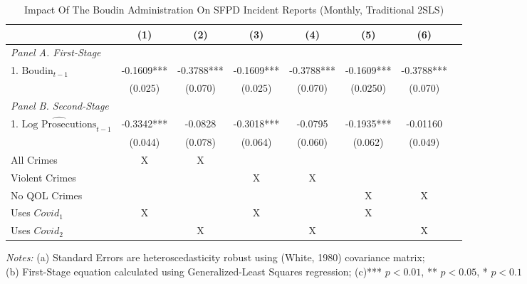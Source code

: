\begin{table}[htbp]
  \centering
  \caption{Impact Of The Boudin Administration On SFPD Incident Reports (Monthly, Traditional 2SLS)}
  \label{tab:regression_incidents_std}
  \begin{tabular}{lccccccc}
    \toprule
    & \multirow{1}{*}{(1)} & \multirow{1}{*}{(2)} & \multirow{1}{*}{(3)} & \multirow{1}{*}{(4)} & \multirow{1}{*}{(5)} & \multirow{1}{*}{(6)} \\
    \midrule
    \textit{Panel A. First-Stage}  &   &   &  &  \\
    1. $\text{Boudin}_{t-1}$  & -0.1609*** & -0.3788*** & -0.1609*** & -0.3788*** & -0.1609*** & -0.3788*** \\
     & (0.025) & (0.070) & (0.025) & (0.070) & (0.0250) & (0.070)
 \\ \addlinespace

    \textit{Panel B. Second-Stage}  &   &   &  &  \\
    1. $\widehat{\text{Log Prosecutions}}_{t-1}$  & -0.3342*** & -0.0828 & -0.3018*** & -0.0795 & -0.1935*** & -0.01160 \\
     & (0.044) & (0.078) & (0.064) & (0.060) & (0.062) & (0.049) \\ \addlinespace
     All Crimes & X & X & & & & \\
     Violent Crimes & & & X & X & & \\
     No QOL Crimes & & & & & X & X \\
     Uses $Covid_1$ & X & & X & & X \\
     Uses $Covid_2$ & & X & & X & & X \\
    \bottomrule
  \end{tabular}

  \begin{flushleft}
    \textit{Notes:} (a) Standard Errors are heteroscedasticity robust using (White, 1980) covariance matrix; \\
    (b) First-Stage equation calculated using Generalized-Least Squares regression; (c)*** $p<0.01$, ** $p<0.05$, * $p<0.1$
  \end{flushleft}
\end{table}